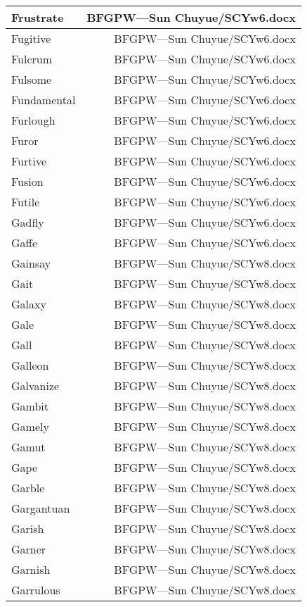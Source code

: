 \documentclass{article}
\begin{document}
\begin{center}
\begin{longtable}{|l|r|}
\hline
Frustrate  &  BFGPW---Sun Chuyue/SCYw6.docx\\  
\hline
Fugitive  &  BFGPW---Sun Chuyue/SCYw6.docx\\  
\hline
Fulcrum  &  BFGPW---Sun Chuyue/SCYw6.docx\\  
\hline
Fulsome  &  BFGPW---Sun Chuyue/SCYw6.docx\\  
\hline
Fundamental  &  BFGPW---Sun Chuyue/SCYw6.docx\\  
\hline
Furlough  &  BFGPW---Sun Chuyue/SCYw6.docx\\  
\hline
Furor  &  BFGPW---Sun Chuyue/SCYw6.docx\\  
\hline
Furtive  &  BFGPW---Sun Chuyue/SCYw6.docx\\  
\hline
Fusion  &  BFGPW---Sun Chuyue/SCYw6.docx\\  
\hline
Futile  &  BFGPW---Sun Chuyue/SCYw6.docx\\  
\hline
Gadfly  &  BFGPW---Sun Chuyue/SCYw6.docx\\  
\hline
Gaffe  &  BFGPW---Sun Chuyue/SCYw6.docx\\  
\hline
Gainsay  &  BFGPW---Sun Chuyue/SCYw8.docx\\  
\hline
Gait  &  BFGPW---Sun Chuyue/SCYw8.docx\\  
\hline
Galaxy  &  BFGPW---Sun Chuyue/SCYw8.docx\\  
\hline
Gale  &  BFGPW---Sun Chuyue/SCYw8.docx\\  
\hline
Gall  &  BFGPW---Sun Chuyue/SCYw8.docx\\  
\hline
Galleon  &  BFGPW---Sun Chuyue/SCYw8.docx\\  
\hline
Galvanize  &  BFGPW---Sun Chuyue/SCYw8.docx\\  
\hline
Gambit  &  BFGPW---Sun Chuyue/SCYw8.docx\\  
\hline
Gamely  &  BFGPW---Sun Chuyue/SCYw8.docx\\  
\hline
Gamut  &  BFGPW---Sun Chuyue/SCYw8.docx\\  
\hline
Gape  &  BFGPW---Sun Chuyue/SCYw8.docx\\  
\hline
Garble  &  BFGPW---Sun Chuyue/SCYw8.docx\\  
\hline
Gargantuan  &  BFGPW---Sun Chuyue/SCYw8.docx\\  
\hline
Garish  &  BFGPW---Sun Chuyue/SCYw8.docx\\  
\hline
Garner  &  BFGPW---Sun Chuyue/SCYw8.docx\\  
\hline
Garnish  &  BFGPW---Sun Chuyue/SCYw8.docx\\  
\hline
Garrulous  &  BFGPW---Sun Chuyue/SCYw8.docx\\  

\end{longtable}
\end{center}
\end{document}
